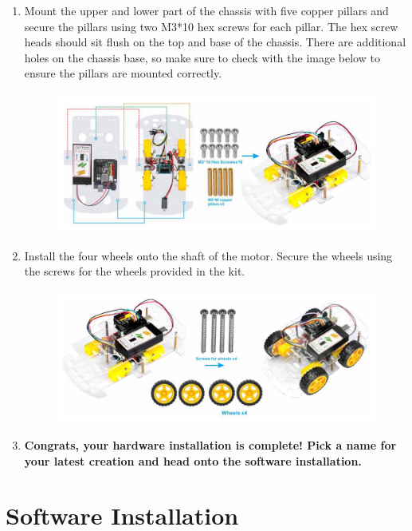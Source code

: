 \documentclass{article}
\begin{document}
\begin{enumerate}
		\item Mount the upper and lower part of the chassis with five copper pillars and secure the pillars using two M3*10 hex screws for each pillar. The hex screw heads should sit flush on the top and base of the chassis. There are additional holes on the chassis base, so make sure to check with the image below to ensure the pillars are mounted correctly.
		
		\begin{figure}[H]
			\centering
			\includegraphics[width=0.7\linewidth]{image14}
			\label{fig:image14}
		\end{figure}
		
		\item Install the four wheels onto the shaft of the motor. Secure the wheels using the screws for the wheels provided in the kit.
		
		\begin{figure}[H]
			\centering
			\includegraphics[width=0.7\linewidth]{image15}
			\label{fig:image15}
		\end{figure}
		
		\item \textbf{Congrats, your hardware installation is complete! Pick a name for your latest creation and head onto the software installation.}
		
	\end{enumerate}
	
	\section{Software Installation}
	
\end{document}

